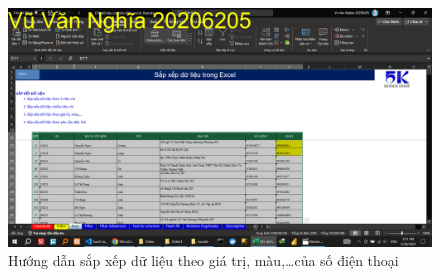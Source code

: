 \documentclass{article}
\begin{document}
\begin{figure}[h]
    \centering
    \includegraphics[scale = 0.15]{Video1/HuongDan/3.png}
    \caption{Hướng dẫn sắp xếp dữ liệu theo giá trị, màu,\dots của số điện thoại}
\end{figure}
\end{document}
